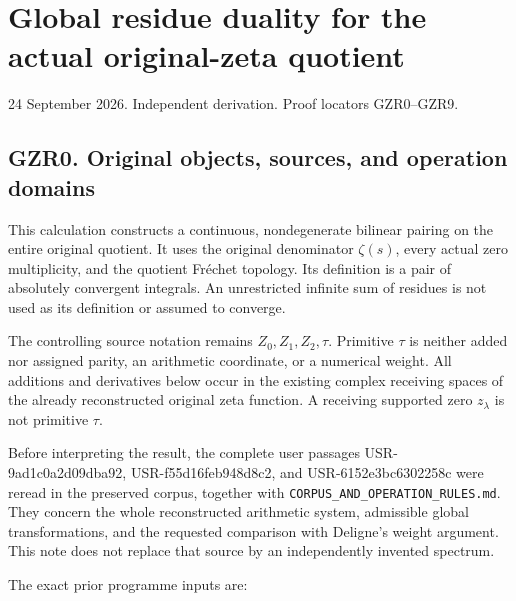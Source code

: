 \section{Global residue duality for the actual original-zeta
quotient}\label{global-residue-duality-for-the-actual-original-zeta-quotient}

24 September 2026. Independent derivation. Proof locators GZR0--GZR9.

\subsection{GZR0. Original objects, sources, and operation
domains}\label{gzr0.-original-objects-sources-and-operation-domains}

This calculation constructs a continuous, nondegenerate bilinear pairing
on the entire original quotient. It uses the original denominator
\(\zeta(s)\), every actual zero multiplicity, and the quotient Fréchet
topology. Its definition is a pair of absolutely convergent integrals.
An unrestricted infinite sum of residues is not used as its definition
or assumed to converge.

The controlling source notation remains \(Z_0,Z_1,Z_2,\tau\). Primitive
\(\tau\) is neither added nor assigned parity, an arithmetic coordinate,
or a numerical weight. All additions and derivatives below occur in the
existing complex receiving spaces of the already reconstructed original
zeta function. A receiving supported zero \(z_\lambda\) is not primitive
\(\tau\).

Before interpreting the result, the complete user passages
USR-9ad1c0a2d09dba92, USR-f55d16feb948d8c2, and USR-6152e3bc6302258c
were reread in the preserved corpus, together with
\nolinkurl{CORPUS_AND_OPERATION_RULES.md}. They concern the whole reconstructed
arithmetic system, admissible global transformations, and the requested
comparison with Deligne's weight argument. This note does not replace
that source by an independently invented spectrum.

The exact prior programme inputs are:

